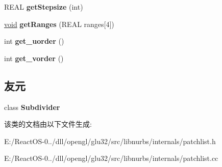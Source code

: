 \begin{DoxyCompactItemize}
R\+E\+AL {\bfseries get\+Stepsize} (int)
\item 
\mbox{\label{class_patchlist_ae7a5609e5796c29e0d62b8746020101d}} 
\hyperlink{interfacevoid}{void} {\bfseries get\+Ranges} (R\+E\+AL ranges\mbox{[}4\mbox{]})
\item 
\mbox{\label{class_patchlist_aae565f1e043d575a7cb7dd9e384a47d1}} 
int {\bfseries get\+\_\+uorder} ()
\item 
\mbox{\label{class_patchlist_a13c85c23837706d78ca9c1b5d97ca0f2}} 
int {\bfseries get\+\_\+vorder} ()
\end{DoxyCompactItemize}
\subsection*{友元}
\begin{DoxyCompactItemize}
\item 
\mbox{\label{class_patchlist_aa261a4fe48ec5e75166591417d334c67}} 
class {\bfseries Subdivider}
\end{DoxyCompactItemize}


该类的文档由以下文件生成\+:\begin{DoxyCompactItemize}
\item 
E\+:/\+React\+O\+S-\/0../dll/opengl/glu32/src/libnurbs/internals/patchlist.\+h\item 
E\+:/\+React\+O\+S-\/0../dll/opengl/glu32/src/libnurbs/internals/patchlist.\+cc\end{DoxyCompactItemize}
